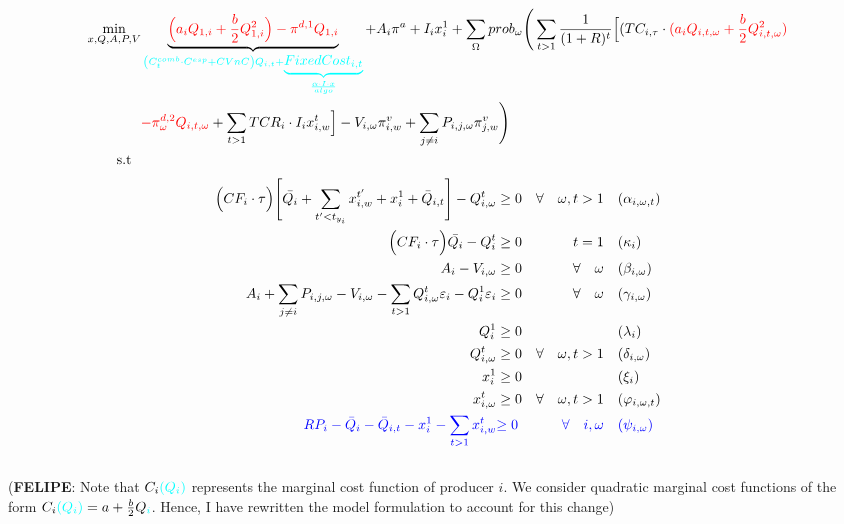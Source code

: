 \documentclass[11pt, letterpaper]{article}
\newcommand{\seba}{\textcolor[rgb]{0,1,1}}
\begin{document}
\begin{align}
\min_{x,Q,A,P,V} & \underbrace{{\color{red}\Big(a_iQ_{1,i}+\frac{b}{2}Q_{1,i}^{2}\Big)-\pi^{d,1} Q_{1,i}}}_{\seba{\left(C_t^{comb}\cdot C^{esp}+CVnC\right)Q_{i,t}+\underbrace{FixedCost_{i,t}}_{\frac{\alpha\cdot I\cdot x}{algo}}}} + A_i \pi^{a} + I_i x_i^{1} + \sum_{\Omega} prob_\omega   \Bigg( \sum_{t>1} \frac{1}{(1+R)^t} \Big[ (TC_{i,\tau}\cdot {\color{red}(a_i Q_{i,t,\omega}+\frac{b}{2}Q_{i,t,\omega}^{2})}\nonumber \\
    & {\color{red}-\pi^{d,2}_{\omega} Q_{i,t,\omega}} + \sum_{t > 1} TCR_i \cdot I_ix^{t}_{i,w} \Big] - V_{i,\omega}\pi_{i,w}^v+\sum_{j\neq i}  P_{i,j,\omega}\pi_{j,w}^v\Bigg)  \\
     \textrm{s.t \ } \nonumber
\end{align}
\begin{align}
    \Big(CF_i \cdot\tau\Big)  \Bigg[\bar{Q_i} + \sum_{t^{\prime}<t_{y_i}} x^{t^{\prime}}_{i,w} + x_i^{1}+ \bar{Q}_{i,t} \Bigg] - Q_{i,\omega}^{t} & \geq 0  & \forall  \quad \omega, t  > 1 & \quad (\alpha_{i,\omega,t}) \label{const.1}\\
    \Big(CF_i\cdot\tau \Big)\bar{Q_i}-Q_{i}^{t} & \geq 0  &  \quad t  =1 & \quad (\kappa_i) \label{const.2} \\
 A_{i} -V_{i,\omega} & \geq  0  & \forall  \quad \omega & \quad (\beta_{i,\omega})\\
 A_{i} + \sum_{j \neq i}P_{i,j,\omega} - V_{i,\omega}-\sum_{t>1}Q_{i, \omega}^{t}\varepsilon_{i}-Q_i^{1}\varepsilon_{i} & \geq  0  &\forall \quad \omega & \quad (\gamma_{i,\omega})\\
 Q_i^{1} & \geq  0 & \quad & \quad (\lambda_i)\\
 Q_{i, \omega}^{t} & \geq  0   & \forall  \quad \omega, t >1 & \quad (\delta_{i,\omega})\\
  x_i^{1} & \geq  0 & \quad & \quad (\xi_i)\\
  x_{i, \omega}^{t} & \geq  0   & \forall  \quad \omega, t >1 & \quad (\varphi_{i,\omega,t})\\
{\color{blue} RP_i - \bar{Q}_i - \bar{Q}_{i,t} - x^{1}_i - \sum_{t > 1} x^{t}_{i,w} } & {\color{blue} \geq 0} & {\color{blue} \forall \quad i,\omega }&  {\color{blue} \quad (\psi_{i,\omega}) }
  \end{align}\\
  
  
 
 (\textbf{FELIPE}: Note that $C_i\seba{(Q_i)}$ represents the \seba{marginal} cost function of producer $i$. We consider quadratic \seba{marginal} cost functions of the form $C_i\seba{(Q_i)}=a+\frac{b}{2}Q\seba{_i}$. Hence, I have rewritten the model formulation to account for this change)
\end{document}
